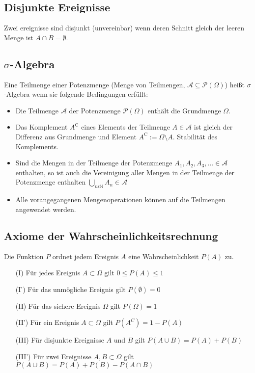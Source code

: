 \documentclass[12pt]{article}
\begin{document}
\subsection{Disjunkte Ereignisse}
Zwei ereignisse sind disjunkt (unvereinbar) wenn deren Schnitt gleich der leeren Menge ist $A \cap B = \emptyset$.

\subsection{$\sigma$-Algebra}
Eine Teilmenge einer Potenzmenge (Menge von Teilmengen, $\mathcal{A}\subseteq\mathcal{P}(\Omega)$) heißt $\sigma$-Algebra wenn sie folgende Bedingungen erfüllt:
\begin{itemize}
	\item Die Teilmenge $\mathcal{A}$ der Potenzmenge $\mathcal{P}(\Omega)$ enthält die Grundmenge $\Omega$.
	\item Das Komplement $A^\mathrm{C}$ eines Elements der Teilmenge $A \in\mathcal{A}$ ist gleich der Differenz aus Grundmenge und Element $A^\mathrm{C} := \Omega\setminus A$. Stabilität des Komplements.
	\item Sind die Mengen in der Teilmenge der Potenzmenge $A_1,A_2,A_3,... \in \mathcal{A}$ enthalten, so ist auch die Vereinigung aller Mengen in der Teilmenge der Potenzmenge enthalten $\bigcup\limits_{n\epsilon \mathbb{N}}A_n \in \mathcal{A}$
	\item Alle vorangegangenen Mengenoperationen können auf die Teilmengen angewendet werden. 
\end{itemize}
\subsection{Axiome der Wahrscheinlichkeitsrechnung}
Die Funktion $P$ ordnet jedem Ereignis $A$ eine Wahrscheinlichkeit $P(A)$ zu.
\begin{enumerate}
	\item[(I)] Für jedes Ereignis $A\subset \Omega$ gilt $0\leq P(A) \leq 1$
	\item[(I')] Für das unmögliche Ereignis gilt $P(\emptyset) = 0$
	\item[(II)] Für das sichere Ereignis $\Omega$ gilt $P(\Omega) = 1$
	\item[(II')] Für ein Ereignis $A \subset \Omega$ gilt $P(A^C) = 1- P(A)$
	\item[(III)] Für disjunkte Ereignisse $A$ und $B$ gilt $P(A\cup B) = P(A)+P(B)$ 
	\item[(III')] Für zwei Ereignisse $A,B \subset \Omega$ gilt $P(A\cup B)= P(A)+P(B)-P(A\cap B)$ 
\end{enumerate}
\end{document}
